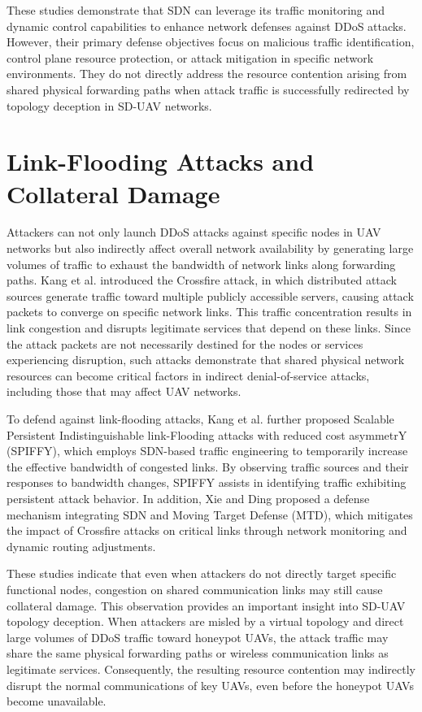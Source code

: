 \begin{ZhChapter}
These studies demonstrate that SDN can leverage its traffic monitoring and dynamic control capabilities to enhance network defenses against DDoS attacks. However, their primary defense objectives focus on malicious traffic identification, control plane resource protection, or attack mitigation in specific network environments. They do not directly address the resource contention arising from shared physical forwarding paths when attack traffic is successfully redirected by topology deception in SD-UAV networks.

\section{Link-Flooding Attacks and Collateral Damage}

Attackers can not only launch DDoS attacks against specific nodes in UAV networks but also indirectly affect overall network availability by generating large volumes of traffic to exhaust the bandwidth of network links along forwarding paths. Kang et al. \cite{kang:2013} introduced the Crossfire attack, in which distributed attack sources generate traffic toward multiple publicly accessible servers, causing attack packets to converge on specific network links. This traffic concentration results in link congestion and disrupts legitimate services that depend on these links. Since the attack packets are not necessarily destined for the nodes or services experiencing disruption, such attacks demonstrate that shared physical network resources can become critical factors in indirect denial-of-service attacks, including those that may affect UAV networks.

To defend against link-flooding attacks, Kang et al. \cite{kang:2016} further proposed Scalable Persistent Indistinguishable link-Flooding attacks with reduced cost asymmetrY (SPIFFY), which employs SDN-based traffic engineering to temporarily increase the effective bandwidth of congested links. By observing traffic sources and their responses to bandwidth changes, SPIFFY assists in identifying traffic exhibiting persistent attack behavior. In addition, Xie and Ding \cite{xie:2019} proposed a defense mechanism integrating SDN and Moving Target Defense (MTD), which mitigates the impact of Crossfire attacks on critical links through network monitoring and dynamic routing adjustments.

These studies indicate that even when attackers do not directly target specific functional nodes, congestion on shared communication links may still cause collateral damage. This observation provides an important insight into SD-UAV topology deception. When attackers are misled by a virtual topology and direct large volumes of DDoS traffic toward honeypot UAVs, the attack traffic may share the same physical forwarding paths or wireless communication links as legitimate services. Consequently, the resulting resource contention may indirectly disrupt the normal communications of key UAVs, even before the honeypot UAVs become unavailable.


\end{ZhChapter}
